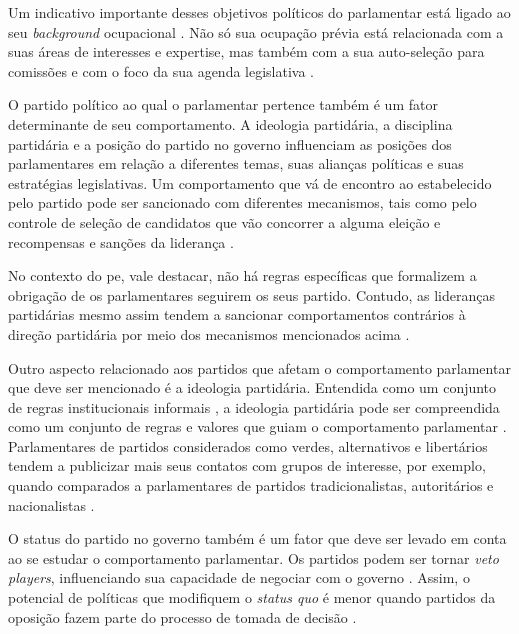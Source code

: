 Um indicativo importante desses objetivos políticos do parlamentar está ligado ao seu \textit{background} ocupacional \cite{damgaard1980dilemma}. Não só sua ocupação prévia está relacionada com a suas áreas de interesses e expertise, mas também com a sua auto-seleção para comissões \cite{hamm2011committee, mcelroy2006committee, yordanova2009rationale} e com o foco da sua agenda legislativa \cite{burden2015personal}.

O partido político ao qual o parlamentar pertence também é um fator determinante de seu comportamento. A ideologia partidária, a disciplina partidária e a posição do partido no governo influenciam as posições dos parlamentares em relação a diferentes temas, suas alianças políticas e suas estratégias legislativas. Um comportamento que vá de encontro ao estabelecido pelo partido pode ser sancionado com diferentes mecanismos, tais como pelo controle de seleção de candidatos que vão concorrer a alguma eleição \cite{carey2007competing, hix2004electoral} e recompensas e sanções da liderança \cite{bressanelli2016impact}.

No contexto do \acrlong{pe}, vale destacar, não há regras específicas que formalizem a obrigação de os parlamentares seguirem os seus partido. Contudo, as lideranças partidárias mesmo assim tendem a sancionar comportamentos contrários à direção partidária por meio dos mecanismos mencionados acima \cite{carey2007competing, hix2004electoral, bressanelli2016impact}.

Outro aspecto relacionado aos partidos que afetam o comportamento parlamentar que deve ser mencionado é a ideologia partidária. Entendida como um conjunto de regras institucionais informais \cite{helmke2012informal}, a ideologia partidária pode ser compreendida como um conjunto de regras e valores que guiam o comportamento parlamentar \cite{hix2004electoral}. Parlamentares de partidos considerados como verdes, alternativos e libertários tendem a publicizar mais seus contatos com grupos de interesse, por exemplo, quando comparados a parlamentares de partidos tradicionalistas, autoritários e nacionalistas \cite{font_legislative_2023}.

O status do partido no governo também é um fator que deve ser levado em conta ao se estudar o comportamento parlamentar. Os partidos podem ser tornar \textit{veto players}, influenciando sua capacidade de negociar com o governo \cite{tsebelis2002veto}. Assim, o potencial de políticas que modifiquem o \textit{status quo} é menor quando partidos da oposição fazem parte do processo de tomada de decisão \cite{ganghof2006government}. 


